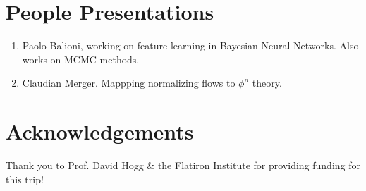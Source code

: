 \documentclass[12pt,fleqn]{article}
\numberwithin{equation}{section} %
\begin{document}
\section{People Presentations} 
\begin{enumerate}
	\item Paolo Balioni, working on feature learning in Bayesian Neural Networks. Also works on MCMC methods.
	\item Claudian Merger. Mappping normalizing flows to $\phi^n$ theory.
\end{enumerate}

\section{Acknowledgements}
Thank you to Prof. David Hogg \& the Flatiron Institute for providing funding for this trip!
\end{document}
